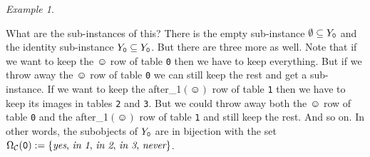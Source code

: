 \documentclass{book}
\def\tn{\textnormal}
\def\mc{\mathcal}
\def\ss{\subseteq}
\def\mcC{\mc{C}}
\theoremstyle{remark}
\newtheorem{example}[subsubsection]{Example}
\theoremstyle{definition}
\begin{document}
\begin{example}
\begin{center}
\end{center}

What are the sub-instances of this? There is the empty sub-instance $\emptyset\ss Y_{\tt 0}$ and the identity sub-instance $Y_{\tt 0}\ss Y_{\tt 0}$. But there are three more as well. Note that if we want to keep the $\smiley$ row of table {\tt 0} then we have to keep everything. But if we throw away the $\smiley$ row of table {\tt 0} we can still keep the rest and get a sub-instance. If we want to keep the after\_1$(\smiley)$ row of table {\tt 1} then we have to keep its images in tables {\tt 2} and {\tt 3}. But we could throw away both the $\smiley$ row of table {\tt 0} and the after\_1$(\smiley)$ row of table {\tt 1} and still keep the rest. And so on. In other words, the subobjects of $Y_{\tt 0}$ are in bijection with the set $\Omega_\mcC({\tt 0}):=\{\tn{{\it yes}, {\it in 1}, {\it in 2}, {\it in 3}, {\it never}}\}$. 


\end{example}
\end{document}
